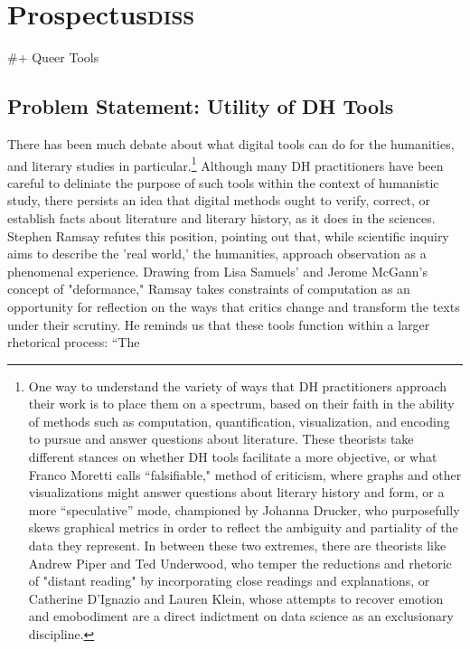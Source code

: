 \documentclass[11pt]{article}
\author{Filipa  Calado}
\date{\today}
\title{}
\begin{document}
\tableofcontents

\section{Prospectus\hfill{}\textsc{diss}}
\label{sec:org46ebdbe}

\#+ Queer Tools

\subsection{Problem Statement: Utility of DH Tools}
\label{sec:org3920e27}

There has been much debate about what digital tools can do for the
humanities, and literary studies in particular.\footnote{One way to understand the variety of ways that DH practitioners
approach their work is to place them on a spectrum, based on their
faith in the ability of methods such as computation, quantification,
visualization, and encoding to pursue and answer questions about
literature. These theorists take different stances on whether DH tools
facilitate a more objective, or what Franco Moretti calls
“falsifiable," method of criticism, where graphs and other
visualizations might answer questions about literary history and form,
or a more “speculative” mode, championed by Johanna Drucker, who
purposefully skews graphical metrics in order to reflect the ambiguity
and partiality of the data they represent. In between these two
extremes, there are theorists like Andrew Piper and Ted Underwood, who
temper the reductions and rhetoric of "distant reading" by
incorporating close readings and explanations, or Catherine D'Ignazio
and Lauren Klein, whose attempts to recover emotion and emobodiment
are a direct indictment on data science as an exclusionary discipline.} Although many DH
practitioners have been careful to deliniate the purpose of such tools
within the context of humanistic study, there persists an idea that
digital methods ought to verify, correct, or establish facts about
literature and literary history, as it does in the sciences. Stephen
Ramsay refutes this position, pointing out that, while scientific
inquiry aims to describe the 'real world,' the humanities, approach
observation as a phenomenal experience. Drawing from Lisa Samuels' and
Jerome McGann's concept of "deformance," Ramsay takes constraints of
computation as an opportunity for reflection on the ways that critics
change and transform the texts under their scrutiny. He reminds us
that these tools function within a larger rhetorical process: “The
\end{document}
